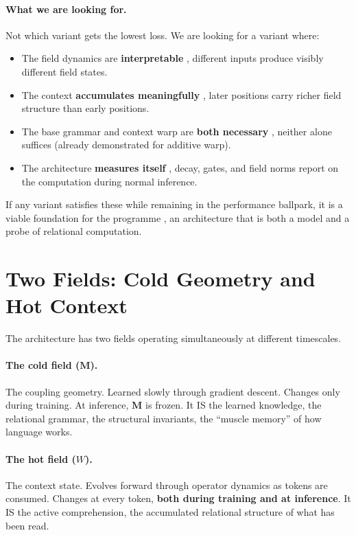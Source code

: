 \documentclass[11pt, a4paper]{article}
\newcommand{\M}{\mathbf{M}}
\theoremstyle{plain}
\theoremstyle{definition}
\theoremstyle{remark}
\begin{document}
\paragraph{What we are looking for.}
Not which variant gets the lowest loss.
We are looking for a variant where:
\begin{itemize}[nosep]
\item The field dynamics are \textbf{interpretable} ,  different inputs produce visibly different field states.
\item The context \textbf{accumulates meaningfully} ,  later positions carry richer field structure than early positions.
\item The base grammar and context warp are \textbf{both necessary} ,  neither alone suffices (already demonstrated for additive warp).
\item The architecture \textbf{measures itself} ,  decay, gates, and field norms report on the computation during normal inference.
\end{itemize}

If any variant satisfies these while remaining in the performance ballpark, it is a viable foundation for the programme ,  an architecture that is both a model and a probe of relational computation.


\section{Two Fields: Cold Geometry and Hot Context}
\label{sec:two-fields}

The architecture has two fields operating simultaneously at different timescales.

\paragraph{The cold field ($\M$).}
The coupling geometry.
Learned slowly through gradient descent.
Changes only during training.
At inference, $\M$ is frozen.
It IS the learned knowledge, the relational grammar, the structural invariants, the ``muscle memory'' of how language works.

\paragraph{The hot field ($W$).}
The context state.
Evolves forward through operator dynamics as tokens are consumed.
Changes at every token, \textbf{both during training and at inference}.
It IS the active comprehension, the accumulated relational structure of what has been read.
\end{document}
